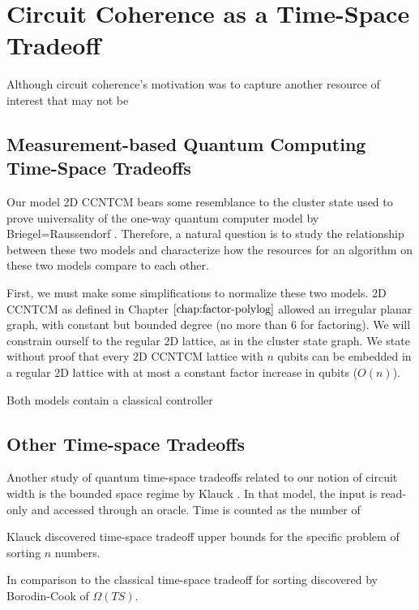 \section{Circuit Coherence as a Time-Space Tradeoff}
\label{sec:cohere-tradeoff}

Although circuit coherence's motivation was to capture another resource
of interest that may not be 

\subsection{Measurement-based Quantum Computing Time-Space Tradeoffs}
\label{subsec:cohere-mbqc}

Our model \textsf{2D CCNTCM} bears some resemblance to the
cluster state used to prove universality of the one-way quantum computer
model by Briegel=Raussendorf \cite{Briegel}. Therefore, a natural question
is to study the relationship between these two models and characterize
how the resources for an algorithm on these two models compare to each other.

First, we must make some simplifications to normalize these two models.
\textsf{2D CCNTCM} as defined in Chapter $\ref{chap:factor-polylog}$ allowed
an irregular planar graph, with constant but bounded degree (no more than
6 for factoring). We will constrain ourself to the regular
2D lattice, as in the cluster state graph. We state without proof that
every \textsf{2D CCNTCM} lattice with $n$ qubits can be embedded in
a regular 2D lattice with at most a constant factor increase in qubits
($O(n)$).

Both models contain a classical controller

\subsection{Other Time-space Tradeoffs}
\label{subsec:cohere-ts-other}

Another study of quantum time-space tradeoffs related to our notion of
circuit width is the bounded space regime by Klauck \cite{Klauck2003}.
In that model, the input is read-only and accessed through an oracle.
Time is counted as the number of 

Klauck discovered time-space tradeoff upper bounds for the specific
problem of sorting $n$ numbers.

In comparison to the classical time-space tradeoff for sorting
discovered by Borodin-Cook \cite{Borodin1982} of $\Omega(TS)$.	

